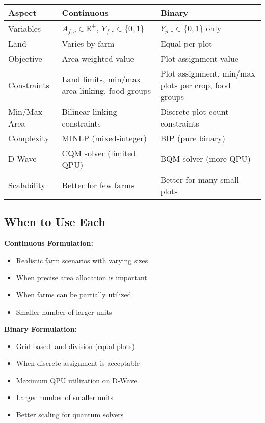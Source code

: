 \documentclass{article}
\begin{document}
\begin{center}
\begin{tabular}{|l|p{5cm}|p{5cm}|}
\hline
\textbf{Aspect} & \textbf{Continuous} & \textbf{Binary} \\
\hline
Variables & $A_{f,c} \in \mathbb{R}^+$, $Y_{f,c} \in \{0,1\}$ & $Y_{p,c} \in \{0,1\}$ only \\
\hline
Land & Varies by farm & Equal per plot \\
\hline
Objective & Area-weighted value & Plot assignment value \\
\hline
Constraints & Land limits, min/max area linking, food groups & Plot assignment, min/max plots per crop, food groups \\
\hline
Min/Max Area & Bilinear linking constraints & Discrete plot count constraints \\
\hline
Complexity & MINLP (mixed-integer) & BIP (pure binary) \\
\hline
D-Wave & CQM solver (limited QPU) & BQM solver (more QPU) \\
\hline
Scalability & Better for few farms & Better for many small plots \\
\hline
\end{tabular}
\end{center}

\subsection{When to Use Each}

\textbf{Continuous Formulation:}
\begin{itemize}
    \item Realistic farm scenarios with varying sizes
    \item When precise area allocation is important
    \item When farms can be partially utilized
    \item Smaller number of larger units
\end{itemize}

\textbf{Binary Formulation:}
\begin{itemize}
    \item Grid-based land division (equal plots)
    \item When discrete assignment is acceptable
    \item Maximum QPU utilization on D-Wave
    \item Larger number of smaller units
    \item Better scaling for quantum solvers
\end{itemize}
\end{document}
